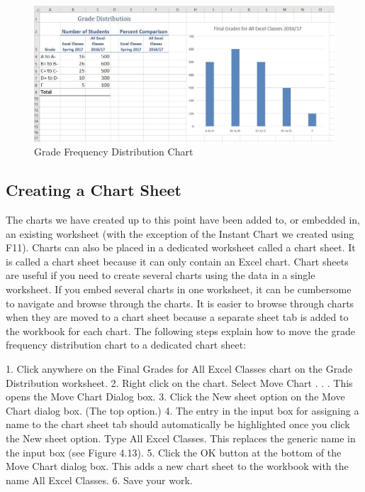 \begin{figure}[H]
	\centering
	\includegraphics[width=\maxwidth{.95\linewidth}]{gfx/ch04_fig15}
	\caption{Grade Frequency Distribution Chart}
	\label{04:fig15}
\end{figure}

\subsection{Creating a Chart Sheet}

The charts we have created up to this point have been added to, or embedded in, an existing
worksheet (with the exception of the Instant Chart we created using F11). Charts can also be placed
in a dedicated worksheet called a chart sheet. It is called a chart sheet because it can only contain an
Excel chart. Chart sheets are useful if you need to create several charts using the data in a single
worksheet. If you embed several charts in one worksheet, it can be cumbersome to navigate and
browse through the charts. It is easier to browse through charts when they are moved to a chart
sheet because a separate sheet tab is added to the workbook for each chart. The following steps
explain how to move the grade frequency distribution chart to a dedicated chart sheet:




1. Click anywhere on the Final Grades for All Excel Classes chart on the Grade Distribution
worksheet.
2. Right click on the chart. Select Move Chart . . . This opens the Move Chart Dialog box.
3. Click the New sheet option on the Move Chart dialog box. (The top option.)
4. The entry in the input box for assigning a name to the chart sheet tab should automatically be
highlighted once you click the New sheet option. Type All Excel Classes. This replaces the
generic name in the input box (see Figure 4.13).
5. Click the OK button at the bottom of the Move Chart dialog box. This adds a new chart sheet to
the workbook with the name All Excel Classes.
6. Save your work.




